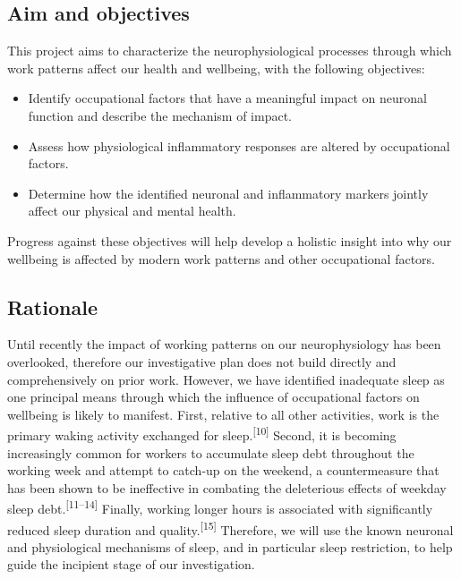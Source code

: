 \documentclass[
  english,
  man,draftall]{apa6}
\providecommand{\tightlist}{%
  \setlength{\itemsep}{0pt}\setlength{\parskip}{0pt}}
\begin{document}
\hypertarget{aim-and-objectives}{%
\subsection{Aim and objectives}\label{aim-and-objectives}}

This project aims to characterize the neurophysiological processes through which work patterns affect our health and wellbeing, with the following objectives:

\begin{itemize}
\tightlist
\item
  Identify occupational factors that have a meaningful impact on neuronal function and describe the mechanism of impact.
\item
  Assess how physiological inflammatory responses are altered by occupational factors.
\item
  Determine how the identified neuronal and inflammatory markers jointly affect our physical and mental health.
\end{itemize}

Progress against these objectives will help develop a holistic insight into why our wellbeing is affected by modern work patterns and other occupational factors.

\newpage

\hypertarget{rationale}{%
\subsection{Rationale}\label{rationale}}

Until recently the impact of working patterns on our neurophysiology has been overlooked, therefore our investigative plan does not build directly and comprehensively on prior work. However, we have identified inadequate sleep as one principal means through which the influence of occupational factors on wellbeing is likely to manifest. First, relative to all other activities, work is the primary waking activity exchanged for sleep.\textsuperscript{{[}10{]}} Second, it is becoming increasingly common for workers to accumulate sleep debt throughout the working week and attempt to catch-up on the weekend, a countermeasure that has been shown to be ineffective in combating the deleterious effects of weekday sleep debt.\textsuperscript{{[}11--14{]}} Finally, working longer hours is associated with significantly reduced sleep duration and quality.\textsuperscript{{[}15{]}} Therefore, we will use the known neuronal and physiological mechanisms of sleep, and in particular sleep restriction, to help guide the incipient stage of our investigation.
\end{document}
